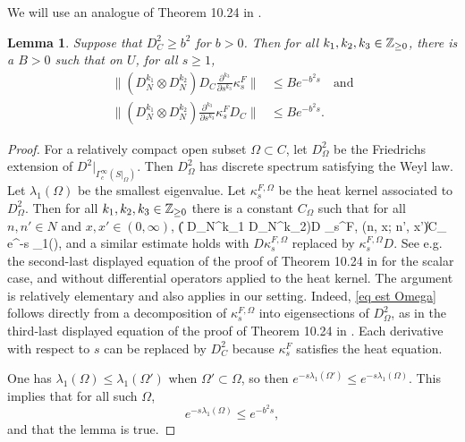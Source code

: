 \documentclass[11pt]{article}
\theoremstyle{plain}
\newtheorem{lemma}[theorem]{Lemma}
\theoremstyle{definition}
\theoremstyle{remark}
\numberwithin{equation}{section}
\begin{document}
We will use an analogue of  Theorem 10.24 in \cite{Grigoryan09}.
\begin{lemma}\label{lem est kappa F}
Suppose that $D_C^2 \geq b^2$ for $b>0$.
Then for all $k_1, k_2, k_3 \in \mathbb{Z}_{\geq 0}$,  there is a $B>0$ such that on $U$, for all $s \geq 1$,
\[
\begin{split}
\| ( D_N^{k_1} \otimes D_N^{k_2})D_C \frac{\partial^{k_3}}{\partial s^{k_3}}\kappa_s^{F}\| & \leq B e^{-b^2s} \quad \text{and}\\
\| ( D_N^{k_1} \otimes D_N^{k_2})\frac{\partial^{k_3}}{\partial s^{k_3}} \kappa_s^{F}D_C\| & \leq B e^{-b^2s}.
\end{split}
\]
\end{lemma}
\begin{proof}
For a relatively compact open subset $\Omega \subset C$, let $D_{\Omega}^2$ be the Friedrichs extension of $D^2|_{\Gamma_c^{\infty}(S|_{\Omega})}$. Then $D_{\Omega}^2$ has discrete spectrum satisfying the Weyl law. Let $\lambda_1(\Omega)$ be the smallest eigenvalue. Let $\kappa_s^{F, \Omega}$ be the  heat kernel associated to $D_{\Omega}^2$.  Then for all $k_1, k_2, k_3 \in \mathbb{Z}_{\geq 0}$ there is a constant $C_{\Omega}$ such that for all $n,n' \in N$ and $x,x' \in (0,\infty)$,
\| ( D_N^{k_1} \otimes D_N^{k_2})D \kappa_s^{F, \Omega}(n, x; n', x')\| \leq C_{\Omega} e^{-s \lambda_1(\Omega)},
\eeq
and a similar estimate holds with $D\kappa_s^{F, \Omega}$ replaced by $\kappa_s^{F, \Omega} D$.
See e.g.\ %
the second-last displayed equation of the proof of Theorem 10.24 in \cite{Grigoryan09}
 for the scalar case, and without differential operators applied to the heat kernel. The argument is relatively elementary and also applies in our setting. Indeed, \eqref{eq est Omega} follows directly from a decomposition of $\kappa_s^{F, \Omega}$ into eigensections of $D_{\Omega}^2$, as in the third-last displayed equation of the proof of Theorem 10.24 in \cite{Grigoryan09}. Each derivative with respect to $s$ can be replaced by  $D_C^2$ because $\kappa_s^F$ satisfies the heat equation.

 One has $\lambda_1(\Omega) \leq \lambda_1(\Omega')$ when $\Omega' \subset \Omega$, so then $e^{-s \lambda_1(\Omega')} \leq e^{-s \lambda_1(\Omega)}$. This implies that  for all such $\Omega$,
\[
e^{-s \lambda_1(\Omega)} \leq e^{-b^2s},
\]
and that the lemma is true.
\end{proof}
\end{document}
